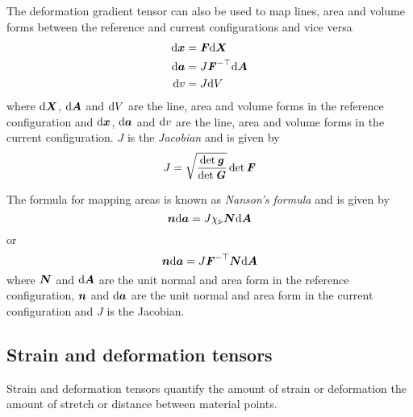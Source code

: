 The deformation gradient tensor can also be used to map lines, area and volume forms
between the reference and current configurations and vice versa \ie
\begin{align}
    {\ensuremath{ \mathrm{d} }} \boldsymbol{x}    &= \boldsymbol{\mathit{F}}  { \mathrm{d} } \boldsymbol{X}    \\
    { \mathrm{d} } \boldsymbol{a}    &= J {\boldsymbol{\mathit{F}}}^{- \top }   { \mathrm{d} } \boldsymbol{A}    \\
    { \mathrm{d} }v   &= J  { \mathrm{d} }V  
\end{align}
where $  { \mathrm{d} } \boldsymbol{X}   $, $  { \mathrm{d} } \boldsymbol{A}   $ and
$  { \mathrm{d} }V  $ are the line, area and volume forms in the reference
configuration and $  { \mathrm{d} } \boldsymbol{x}   $, $  { \mathrm{d} } \boldsymbol{a}   $ and
$  { \mathrm{d} }v  $ are the line, area and volume forms in the current
configuration. $J$ is the \emph{Jacobian} and is given by
\begin{equation}
  J=\sqrt{\dfrac{\det \boldsymbol{\mathit{g}}}{\det \boldsymbol{\mathit{G}}}}\det \boldsymbol{\mathit{F}}
\end{equation}

The formula for mapping areas is known as \emph{Nanson's formula} and is
given by
\begin{equation}
   \boldsymbol{n}   { \mathrm{d} } \boldsymbol{a}   =J \chi_{\triangleright} \boldsymbol{N}   { \mathrm{d} } \boldsymbol{A}    
\end{equation}
or
\begin{equation}
   \boldsymbol{n}   { \mathrm{d} } \boldsymbol{a}   =J {\boldsymbol{\mathit{F}}}^{- \top }  \boldsymbol{N}   { \mathrm{d} } \boldsymbol{A}   
\end{equation}
where $ \boldsymbol{N} $ and $  { \mathrm{d} } \boldsymbol{A}   $ are the unit normal and
area form in the reference configuration,  $ \boldsymbol{n} $ and $  { \mathrm{d} } \boldsymbol{a}   $ are the unit normal and
area form in the current configuration and $J$ is the Jacobian. 
  
\subsection{Strain and deformation tensors}

Strain and deformation tensors quantify the amount of strain or deformation
\ie the amount of stretch or distance between material points.  

